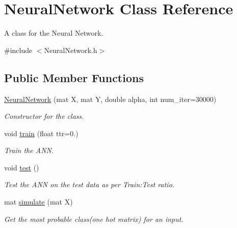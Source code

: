 \hypertarget{classNeuralNetwork}{}\section{Neural\+Network Class Reference}
\label{classNeuralNetwork}


A class for the Neural Network.  




{\ttfamily \#include $<$Neural\+Network.\+h$>$}

\subsection*{Public Member Functions}
\begin{DoxyCompactItemize}
\item 
\hyperlink{classNeuralNetwork_a2e6c1d53b25f32ab7b86f5724fda034e}{Neural\+Network} (mat X, mat Y, double alpha, int num\+\_\+iter=30000)
\begin{DoxyCompactList}\small\item\em Constructor for the class. \end{DoxyCompactList}\item 
void \hyperlink{classNeuralNetwork_a0f31b5c177741a64477f110724bf2eb7}{train} (float ttr=0.)
\begin{DoxyCompactList}\small\item\em Train the A\+NN. \end{DoxyCompactList}\item 
\mbox{\label{classNeuralNetwork_afcef9bd92f4ba54ef9e6fad40055a825}} 
void \hyperlink{classNeuralNetwork_afcef9bd92f4ba54ef9e6fad40055a825}{test} ()
\begin{DoxyCompactList}\small\item\em Test the A\+NN on the test data as per Train\+:Test ratio. \end{DoxyCompactList}\item 
\mbox{\label{classNeuralNetwork_acc188d528a0c4763512be978e8be78bd}} 
mat \hyperlink{classNeuralNetwork_acc188d528a0c4763512be978e8be78bd}{simulate} (mat X)
\begin{DoxyCompactList}\small\item\em Get the most probable class(one hot matrix) for an input. \end{DoxyCompactList}\item 
\mbox{\label{classNeuralNetwork_a7823498a83db91a5bd6ef211d50a0013}} 

\end{DoxyCompactItemize}
